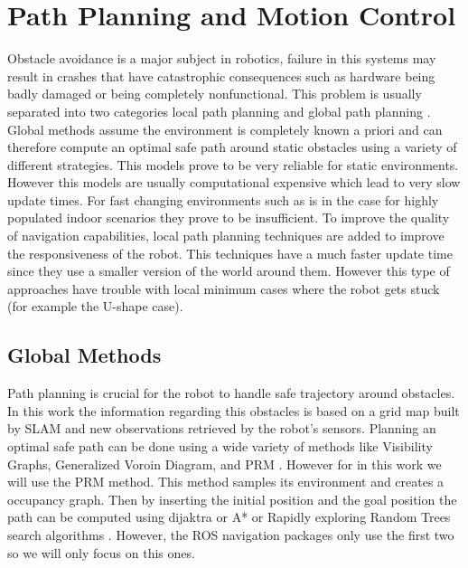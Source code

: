 \section{Path Planning and Motion Control}
 Obstacle avoidance is a major subject in robotics, failure in this systems may result in crashes that have catastrophic consequences such as hardware being badly damaged or being completely nonfunctional. This problem is usually separated into two categories local path planning and global path planning \cite{foxdwa}. 
 Global methods assume the environment is completely known a priori and can therefore compute an optimal safe path  around static obstacles using a variety of different strategies. This models prove to be very reliable for static environments. However this models are usually computational expensive which lead to very slow update times. For fast changing environments such as is in the case for highly populated indoor scenarios they prove to be insufficient. 
 To improve the quality of navigation capabilities, local path planning techniques are added to improve the responsiveness of the robot. This techniques have a much faster update time  since they use a smaller version of the world around them. However this type of approaches have trouble with local minimum cases where the robot gets stuck (for example the U-shape case).
\subsection{Global Methods}
Path planning is crucial for the robot to handle safe trajectory around obstacles. In this work the information regarding this obstacles is based on a grid map built by \ac{SLAM} and new observations retrieved by the robot's sensors.  Planning an optimal safe path can be done using a wide variety of methods like Visibility Graphs, Generalized Voroin Diagram, and \ac{PRM} \cite{globalmethods}. However for in this work we will use the \ac{PRM} method. This method samples its environment and creates a occupancy graph. Then by inserting the initial position and the goal position the path can be computed using dijaktra or A* or Rapidly exploring Random Trees search algorithms . However, the \ac{ROS} navigation packages only use the first two so  we will only focus on this ones.



